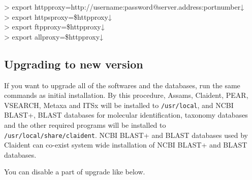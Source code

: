\documentclass[titlepage,10pt,a4paper,english]{jsbook}
\newenvironment{cmd}{\begin{oframed}\raggedright\ttfamily\footnotesize\setlength{\baselineskip}{1.4em}}{\end{oframed}\vspace{-1em}}
\begin{document}
\begin{cmd}
{\textgreater} export http{\textunderscore}proxy=http://username:password@server.address:portnumber↓\\
{\textgreater} export https{\textunderscore}proxy=\$http{\textunderscore}proxy↓\\
{\textgreater} export ftp{\textunderscore}proxy=\$http{\textunderscore}proxy↓\\
{\textgreater} export all{\textunderscore}proxy=\$http{\textunderscore}proxy↓
\end{cmd}

\subsection{Upgrading to new version}

If you want to upgrade all of the softwares and the databases, run the same commands as initial installation.
By this procedure, Assams, Claident, PEAR, VSEARCH, Metaxa and ITSx will be installed to \texttt{/usr/local}, and NCBI BLAST+, BLAST databases for molecular identification, taxonomy databases and the other required programs will be installed to \texttt{/usr/local/share/claident}.
NCBI BLAST+ and BLAST databases used by Claident can co-exist system wide installation of NCBI BLAST+ and BLAST databases.

You can disable a part of upgrade like below.
\end{document}
